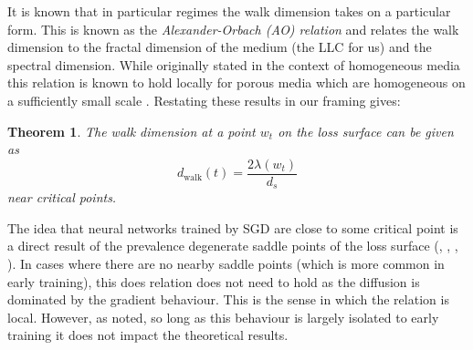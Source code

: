 \documentclass{article} %
\newtheorem{theorem}{Theorem}[section]
\theoremstyle{definition}
\newtheorem{definition}{Definition}[section]
\begin{document}
It is known that in particular regimes the walk dimension takes on a particular form. This is known as the \textit{Alexander-Orbach (AO) relation} and relates the walk dimension to the fractal dimension of the medium (the LLC for us) and the spectral dimension. While originally stated in the context of homogeneous media this relation is known to hold locally for porous media which are homogeneous on a sufficiently small scale \citep{HAMBLY_KIGAMI_KUMAGAI_2002}. Restating these results in our framing gives:
\begin{theorem}\label{def:non_hom_walk}
    The walk dimension at a point $w_t$ on the loss surface can be given as
    \begin{equation}
        d_\text{walk}(t) = \frac{2\lambda(w_t)}{d_s}
    \end{equation}
    near critical points.
\end{theorem}
The idea that neural networks trained by SGD are close to some critical point is a direct result of the prevalence degenerate saddle points of the loss surface (\citep{dauphin2014identifyingattackingsaddlepoint}, \citep{ADVANI2020428}, \citep{Fukumizu2000Local}, \citep{choromanska2015losssurfacesmultilayernetworks}). In cases where there are no nearby saddle points (which is more common in early training), this does relation does not need to hold as the diffusion is dominated by the gradient behaviour. This is the sense in which the relation is local. However, as noted, so long as this behaviour is largely isolated to early training it does not impact the theoretical results.

\end{document}
